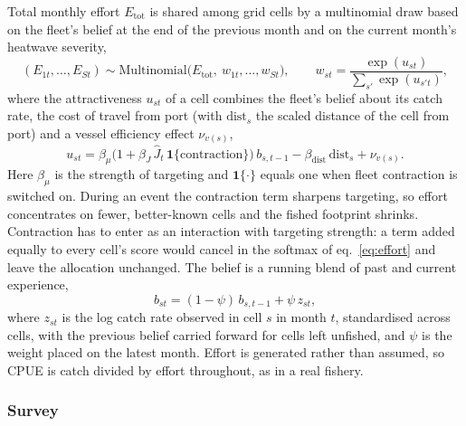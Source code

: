 \documentclass[11pt,a4paper]{article}
\newcommand{\vt}[1]{\text{#1}}
\begin{document}
Total monthly effort $E_{\vt{tot}}$ is shared among grid cells by a multinomial draw based on the fleet's belief at the end of the previous month and on the current month's heatwave severity,
\begin{equation}
(E_{1t},\dots,E_{St}) \sim \vt{Multinomial}\big(E_{\vt{tot}},\ w_{1t},\dots,w_{St}\big), \qquad w_{st} = \frac{\exp(u_{st})}{\sum_{s'}\exp(u_{s't})},
\label{eq:effort}
\end{equation}
where the attractiveness $u_{st}$ of a cell combines the fleet's belief about its catch rate, the cost of travel from port (with $\vt{dist}_s$ the scaled distance of the cell from port) and a vessel efficiency effect $\nu_{v(s)}$,
\begin{equation}
u_{st} = \beta_\mu\big(1+\beta_J\,\hat J_t\,\mathbf{1}\{\vt{contraction}\}\big)\,b_{s,t-1} - \beta_{\vt{dist}}\,\vt{dist}_s + \nu_{v(s)} .
\label{eq:score}
\end{equation}
Here $\beta_\mu$ is the strength of targeting and $\mathbf{1}\{\cdot\}$ equals one when fleet contraction is switched on. During an event the contraction term sharpens targeting, so effort concentrates on fewer, better-known cells and the fished footprint shrinks. Contraction has to enter as an interaction with targeting strength: a term added equally to every cell's score would cancel in the softmax of eq.~\eqref{eq:effort} and leave the allocation unchanged. The belief is a running blend of past and current experience,
\begin{equation}
b_{st} = (1-\psi)\,b_{s,t-1} + \psi\,z_{st},
\label{eq:belief}
\end{equation}
where $z_{st}$ is the log catch rate observed in cell $s$ in month $t$, standardised across cells, with the previous belief carried forward for cells left unfished, and $\psi$ is the weight placed on the latest month. Effort is generated rather than assumed, so CPUE is catch divided by effort throughout, as in a real fishery.

\subsubsection{Survey}
\end{document}
